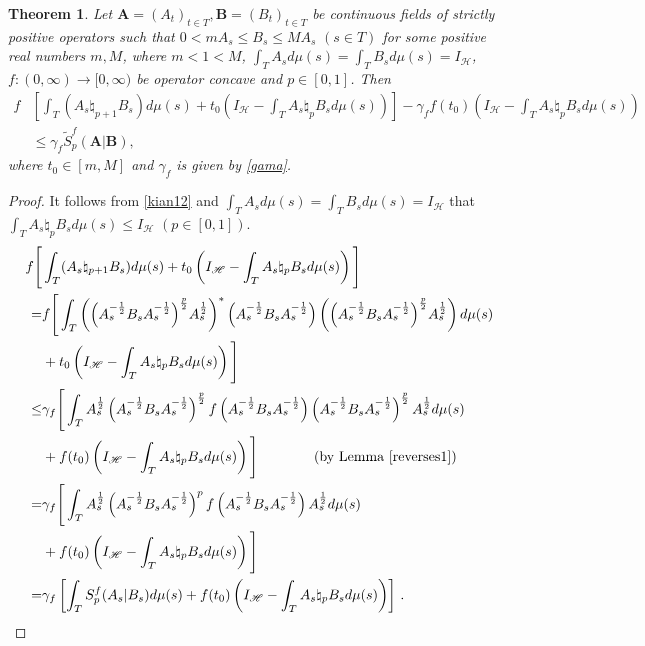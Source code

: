\documentclass[12pt, reqno]{amsart}
\newtheorem{theorem}{Theorem}[section]
\theoremstyle{definition}
\theoremstyle{remark}
\numberwithin{equation}{section}
\begin{document}
\begin{theorem}\label{tShEnIn}
Let $\mathbf{A}=(A_t)_{t\in T}, \mathbf{B}=(B_t)_{t\in T}$ be continuous fields of strictly positive operators such that  $0<m A_s \leq B_s \leq M A_s\,\,(s\in T)$  for some positive real numbers $m, M$, where $m<1<M$,  $\int_TA_sd\mu(s)=\int_TB_sd\mu(s)=I_{\mathscr H}$, $f: (0,\infty) \to [0,\infty)$ be  operator
concave and $p\in[0,1]$. Then
{\footnotesize
\begin{align}\label{ShEnInre}
f&\left[\int_T(A_s\natural_{p+1}B_s)d\mu(s)+t_0\left(I_{\mathscr H}-\int_TA_s\natural_pB_sd\mu(s)\right)\right]-\gamma_ff(t_0)\left(I_{\mathscr H}-\int_TA_s\natural_pB_sd\mu(s)\right)\nonumber\\
&\le \gamma_f\widetilde{S}_p^f(\mathbf{A}|\mathbf{B}),
\end{align}}
where $t_0\in[m,M]$ and $\gamma_f$ is given by \eqref{gama}.
\end{theorem}
\begin{proof}
It follows from \eqref{kian12} and $\int_TA_sd\mu(s)=\int_TB_sd\mu(s)=I_{\mathscr H}$ that $\int_TA_s \natural_{p} B_s d\mu(s)\le I_{\mathscr H}\,\,(p\in[0,1])$.
\begin{align*}
f\Bigg[&\int_T(A_s\natural_{p+1}B_s)d\mu(s)+t_0\left(I_{\mathscr H}-\int_TA_s\natural_pB_sd\mu(s)\right)\Bigg]\\
=&f\Bigg[\int_T\left(\Big(A_s^{-\frac{1}{2}}B_sA_s^{-\frac{1}{2}}\Big)^{\frac{p}{2}}A_s^{\frac{1}{2}}\right)^*
\Big(A_s^{-\frac{1}{2}}B_sA_s^{-\frac{1}{2}}\Big)\left(\Big(A_s^{-\frac{1}{2}}B_sA_s^{-\frac{1}{2}}\Big)^{\frac{p}{2}}A_s^{\frac{1}{2}}\right)d\mu(s)\\
&+t_0\left(I_{\mathscr H}-\int_TA_s\natural_p B_sd\mu(s)\right)\Bigg]\\
\le &\gamma_f\Bigg[\int_TA_s^{\frac{1}{2}}\left(A_s^{-\frac{1}{2}}B_sA_s^{-\frac{1}{2}}\right)^{\frac{p}{2}}
f\left(A_s^{-\frac{1}{2}}B_sA_s^{-\frac{1}{2}}\right)\left(A_s^{-\frac{1}{2}}B_sA_s^{-\frac{1}{2}}\right)^{\frac{p}{2}}
A_s^{\frac{1}{2}}d\mu(s)\\
&+f(t_0)\left(I_{\mathscr H}-\int_TA_s\natural_pB_sd\mu(s)\right)\Bigg]\quad\quad\quad\quad\mbox{(by Lemma \ref{reverses1})}\\
=&\gamma_f\Bigg[\int_TA_s^{\frac{1}{2}}\left(A_s^{-\frac{1}{2}}B_sA_s^{-\frac{1}{2}}\right)^p
f\left(A_s^{-\frac{1}{2}}B_sA_s^{-\frac{1}{2}}\right)A_s^{\frac{1}{2}}d\mu(s)\\
&+f(t_0)\left(I_{\mathscr H}-\int_TA_s\natural_pB_sd\mu(s)\right)\Bigg]\\
=&\gamma_f\left[\int_TS_p^f(A_s|B_s)d\mu(s)+f(t_0)\left(I_{\mathscr H}-\int_TA_s\natural_pB_sd\mu(s)\right)\right]\,.
\end{align*}
\end{proof}
\end{document}
